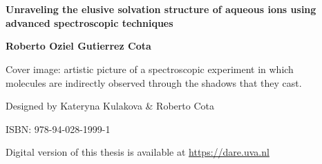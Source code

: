 

\newcommand{\bigsizes}{\fontsize{17pt}{20pt}\selectfont}
\newcommand{\Namesize}{\fontsize{13pt}{20pt}\selectfont}
\newcommand{\Titulosize}{\fontsize{13pt}{20pt}\selectfont}

\chapter*{}
\setcounter{page}{1}
\thispagestyle{empty}






\vspace{13pt}
\begin{center}
	{\bfseries\bigsizes\color{SchoolColor} Unraveling the elusive solvation structure of aqueous ions using advanced spectroscopic techniques} \normalsize \\
\end{center}

\vspace{9.0cm}
	
\begin{center}	
{\bfseries\Namesize Roberto Oziel Gutierrez Cota}
\end{center}
\vspace*{\fill}




\newpage
\thispagestyle{empty}

\vspace*{\fill}
\vspace{10cm}

\noindent Cover image: artistic picture of a spectroscopic experiment in which \\molecules are indirectly observed through the shadows that they cast.

\medskip

\noindent Designed by Kateryna Kulakova \& Roberto Cota

\vspace{0.6cm}

\noindent ISBN: 978-94-028-1999-1

\vspace{0.6cm}

\noindent Digital version of this thesis is available at 
\href{https://dare.uva.nl}{https://dare.uva.nl} 


